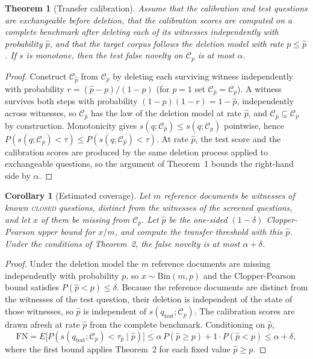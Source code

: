 \documentclass[10pt,a4paper]{article}
\newtheorem{theorem}{Theorem}
\newtheorem{corollary}{Corollary}
\theoremstyle{definition}
\theoremstyle{remark}
\newcommand{\closed}{\textup{\textsc{closed}}}
\begin{document}
\begin{theorem}[Transfer calibration]
Assume that the calibration and test questions are exchangeable before deletion, that the calibration scores are computed on a complete benchmark after deleting each of its witnesses independently with probability $\hat p$, and that the target corpus follows the deletion model with rate $p\le\hat p$. If $s$ is monotone, then the test false novelty on $\mathcal{C}_p$ is at most $\alpha$.
\end{theorem}
\begin{proof}
Construct $\mathcal{C}_{\hat p}$ from $\mathcal{C}_p$ by deleting each surviving witness independently with probability $r=(\hat p-p)/(1-p)$ (for $p=1$ set $\mathcal{C}_{\hat p}=\mathcal{C}_p$). A witness survives both steps with probability $(1-p)(1-r)=1-\hat p$, independently across witnesses, so $\mathcal{C}_{\hat p}$ has the law of the deletion model at rate $\hat p$, and $\mathcal{C}_{\hat p}\subseteq\mathcal{C}_p$ by construction. Monotonicity gives $s(q;\mathcal{C}_{\hat p})\le s(q;\mathcal{C}_p)$ pointwise, hence
$P(s(q;\mathcal{C}_p)<\tau)\le P(s(q;\mathcal{C}_{\hat p})<\tau)$.
At rate $\hat p$, the test score and the calibration scores are produced by the same deletion process applied to exchangeable questions, so the argument of Theorem~1 bounds the right-hand side by $\alpha$.
\end{proof}

\begin{corollary}[Estimated coverage]
Let $m$ reference documents be witnesses of known \closed{} questions, distinct from the witnesses of the screened questions, and let $x$ of them be missing from $\mathcal{C}_p$. Let $\hat p$ be the one-sided $(1-\delta)$ Clopper-Pearson upper bound for $x/m$, and compute the transfer threshold with this $\hat p$. Under the conditions of Theorem~2, the false novelty is at most $\alpha+\delta$.
\end{corollary}
\begin{proof}
Under the deletion model the $m$ reference documents are missing independently with probability $p$, so $x\sim\mathrm{Bin}(m,p)$ and the Clopper-Pearson bound satisfies $P(\hat p<p)\le\delta$. Because the reference documents are distinct from the witnesses of the test question, their deletion is independent of the state of those witnesses, so $\hat p$ is independent of $s(q_{\mathrm{test}};\mathcal{C}_p)$. The calibration scores are drawn afresh at rate $\hat p$ from the complete benchmark. Conditioning on $\hat p$,
\[
\mathrm{FN}=E\big[P(s(q_{\mathrm{test}};\mathcal{C}_p)<\tau_{\hat p}\mid\hat p)\big]
\le \alpha\,P(\hat p\ge p)+1\cdot P(\hat p<p)\le\alpha+\delta,
\]
where the first bound applies Theorem~2 for each fixed value $\hat p\ge p$.
\end{proof}
\end{document}
